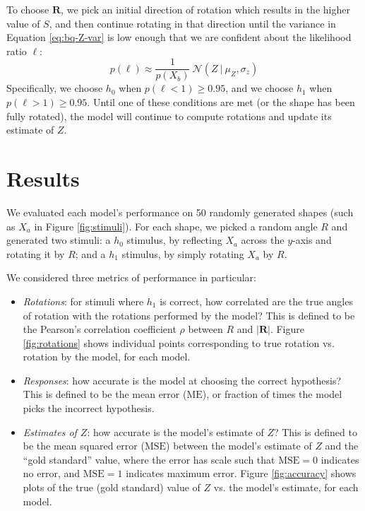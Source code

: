 \documentclass{article} %
\begin{document}
To choose $\mathbf{R}$, we pick an initial direction of rotation which
results in the higher value of $S$, and then continue rotating in that
direction until the variance in Equation \ref{eq:bq-Z-var} is low
enough that we are confident about the likelihood ratio $\ell$:
\begin{equation*}
p(\ell)\approx\frac{1}{p(X_b)}\ \mathcal{N}(Z\ \vert\ \mu_Z, \sigma_z)
\end{equation*}
Specifically, we choose $h_0$ when $p(\ell < 1)\geq 0.95$, and we
choose $h_1$ when $p(\ell > 1)\geq 0.95$. Until one of these
conditions are met (or the shape has been fully rotated), the model
will continue to compute rotations and update its estimate of $Z$.

\section{Results}

We evaluated each model's performance on 50 randomly generated shapes
(such as $X_a$ in Figure \ref{fig:stimuli}). For each shape, we picked
a random angle $R$ and generated two stimuli: a $h_0$ stimulus, by
reflecting $X_a$ across the $y$-axis and rotating it by $R$; and a
$h_1$ stimulus, by simply rotating $X_a$ by $R$.

We considered three metrics of performance in particular:
\begin{itemize}
\item \textit{Rotations}: for stimuli where $h_1$ is correct, how
  correlated are the true angles of rotation with the rotations
  performed by the model? This is defined to be the Pearson's
  correlation coefficient $\rho$ between $R$ and $\vert
  \mathbf{R}\vert$. Figure \ref{fig:rotations} shows individual points
  corresponding to true rotation vs. rotation by the model, for each
  model.
\item \textit{Responses}: how accurate is the model at choosing the
  correct hypothesis? This is defined to be the mean error
  ($\mathrm{ME}$), or fraction of times the model picks the incorrect
  hypothesis.
\item \textit{Estimates of $Z$}: how accurate is the model's estimate
  of $Z$? This is defined to be the mean squared error
  ($\mathrm{MSE}$) between the model's estimate of $Z$ and the ``gold
  standard'' value, where the error has scale such that
  $\mathrm{MSE}=0$ indicates no error, and $\mathrm{MSE}=1$ indicates
  maximum error. Figure \ref{fig:accuracy} shows plots of the true
  (gold standard) value of $Z$ vs. the model's estimate, for each
  model.
\end{itemize}
\end{document}
